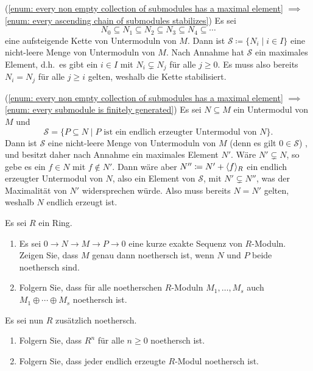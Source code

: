 \begin{solution}
  
  (\ref{enum: every non empty collection of submodules has a maximal element}
  $\implies$
  \ref{enum: every ascending chain of submodules stabilizes})
  Es sei
  \[
              N_0
    \subseteq N_1
    \subseteq N_2
    \subseteq N_3
    \subseteq N_4
    \subseteq \dotsb
  \]
  eine aufsteigende Kette von Untermoduln von $M$.
  Dann ist $\mathcal{S} \coloneqq \{N_i \mid i \in I\}$ eine nicht-leere Menge von Untermoduln von $M$.
  Nach Annahme hat $\mathcal{S}$ ein maximales Element, d.h.\ es gibt ein $i \in I$ mit $N_i \subsetneq N_j$ für alle $j \geq 0$.
  Es muss also bereits $N_i = N_j$ für alle $j \geq i$ gelten, weshalb die Kette stabilisiert.
  
  (\ref{enum: every non empty collection of submodules has a maximal element}
  $\implies$
  \ref{enum: every submodule is finitely generated})
  Es sei $N \subseteq M$ ein Untermodul von $M$ und
  \[
      \mathcal{S}
    = \{
        P \subseteq N
      \mid
        \text{$P$ ist ein endlich erzeugter Untermodul von $N$}
      \}.
  \]
  Dann ist $\mathcal{S}$ eine nicht-leere Menge von Untermoduln von $M$ (denn es gilt $0 \in \mathcal{S}$) , und besitzt daher nach Annahme ein maximales Element $N'$.
  Wäre $N' \subsetneq N$, so gebe es ein $f \in N$ mit $f \notin N'$.
  Dann wäre aber $N'' \coloneqq N' + \langle f\rangle_R$ ein endlich erzeugter Untermodul von $N$, also ein Element von $\mathcal{S}$, mit $N' \subsetneq N''$, was der Maximalität von $N'$ widersprechen würde.
  Also muss bereits $N = N'$ gelten, weshalb $N$ endlich erzeugt ist.
\end{solution}


\begin{question}[subtitle = Konstruktionen mit noetherschen Moduln]
  \label{question: properties of noetherian modules}
  Es sei $R$ ein Ring.
  \begin{enumerate}
    \item
      Es sei $0 \to N \to M \to P \to 0$ eine kurze exakte Sequenz von $R$-Moduln.
      Zeigen Sie, dass $M$ genau dann noethersch ist, wenn $N$ und $P$ beide noethersch sind.
    \item
      Folgern Sie, dass für alle noetherschen $R$-Moduln $M_1, \dotsc, M_s$ auch $M_1 \oplus \dotsb \oplus M_s$ noethersch ist.
  \end{enumerate}
  Es sei nun $R$ zusätzlich noethersch.
  \begin{enumerate}[resume]
    \item
      Folgern Sie, dass $R^n$ für alle $n \geq 0$ noethersch ist.
    \item
      Folgern Sie, dass jeder endlich erzeugte $R$-Modul noethersch ist.
  \end{enumerate}  
\end{question}


